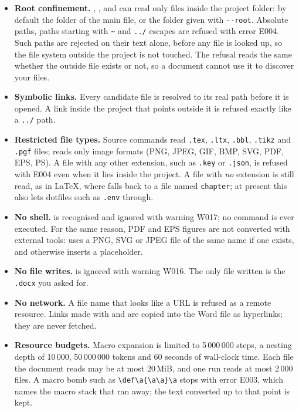 \begin{itemize}
  \item \textbf{Root confinement.} , , 
    and  can read only files inside the project folder:
    by default the folder of the main file, or the folder given with
    \verb|--root|. Absolute paths, paths starting with \verb|~| and \verb|../|
    escapes are refused with error E004. Such paths are rejected on their text
    alone, before any file is looked up, so the file system outside the
    project is not touched. The
    refusal reads the same whether the outside file exists or not, so a
    document cannot use it to discover your files.
  \item \textbf{Symbolic links.} Every candidate file is resolved to its real
    path before it is opened. A link inside the project that points outside
    it is refused exactly like a \verb|../| path.
  \item \textbf{Restricted file types.} Source commands read
    \texttt{.tex}, \texttt{.ltx}, \texttt{.bbl}, \texttt{.tikz} and
    \texttt{.pgf} files;  reads only image formats
    (PNG, JPEG, GIF, BMP, SVG, PDF, EPS, PS). A file with any other extension,
    such as \texttt{.key} or \texttt{.json}, is refused with E004 even when
    it lies inside the project. A file with \emph{no} extension is still
    read, as in \LaTeX{}, where \verb|| falls back to a file
    named \texttt{chapter}; at present this also lets dotfiles such as
    \texttt{.env} through.
  \item \textbf{No shell.}  is recognised and ignored with
    warning W017; no command is ever executed. For the same reason, PDF and
    EPS figures are not converted with external tools: \texdocx{} uses a PNG,
    SVG or JPEG file of the same name if one exists, and otherwise inserts a
    placeholder.
  \item \textbf{No file writes.}  is ignored with warning W016.
    The only file written is the \texttt{.docx} you asked for.
  \item \textbf{No network.} A file name that looks like a URL is refused as a
    remote resource. Links made with  and  are copied
    into the Word file as hyperlinks; they are never fetched.
  \item \textbf{Resource budgets.} Macro expansion is limited to 5\,000\,000
    steps, a nesting depth of 10\,000, 50\,000\,000 tokens and 60 seconds of
    wall-clock time. Each file the document reads may be at most 20\,MiB,
    and one run reads at most 2\,000 files. A macro bomb such as \verb|\def\a{\a\a}\a| stops with
    error E003, which names the macro stack that ran away; the text converted
    up to that point is kept.
\end{itemize}


